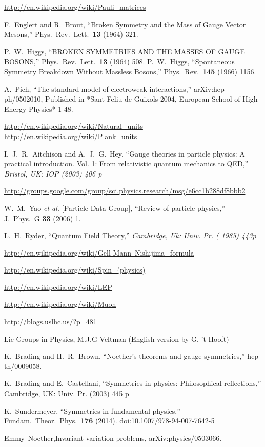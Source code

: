 \begin{thebibliography}{999}
\url{http://en.wikipedia.org/wiki/Pauli_matrices}

  F.~Englert and R.~Brout,
  ``Broken Symmetry and the Mass of Gauge Vector Mesons,''
  Phys.\ Rev.\ Lett.\  {\bf 13} (1964) 321.

  P.~W.~Higgs,
  ``BROKEN SYMMETRIES AND THE MASSES OF GAUGE BOSONS,''
  Phys.\ Rev.\ Lett.\  {\bf 13} (1964) 508.
  P.~W.~Higgs,
  ``Spontaneous Symmetry Breakdown Without Massless Bosons,''
  Phys.\ Rev.\  {\bf 145} (1966) 1156.


  A.~Pich,
  ``The standard model of electroweak interactions,''
  arXiv:hep-ph/0502010,
  Published in *Sant Feliu de Guixols 2004, European School of High-Energy Physics* 1-48.

\url{http://en.wikipedia.org/wiki/Natural_units}
\url{http://en.wikipedia.org/wiki/Plank_units}

  I.~J.~R.~Aitchison and A.~J.~G.~Hey,
  ``Gauge theories in particle physics: A practical introduction. Vol. 1: From
  relativistic quantum mechanics to QED,''
{\it  Bristol, UK: IOP (2003) 406 p}

\url{http://groups.google.com/group/sci.physics.research/msg/e6cc1b288df8bbb2}

 W.~M.~Yao {\it et al.}  [Particle Data Group],
  ``Review of particle physics,''
  J.\ Phys.\ G {\bf 33} (2006) 1.

  L.~H.~Ryder,
  ``Quantum Field Theory,''
{\it  Cambridge, Uk: Univ. Pr. ( 1985) 443p}

\url{http://en.wikipedia.org/wiki/Gell-Mann–Nishijima_formula}

\url{http://en.wikipedia.org/wiki/Spin_(physics)}

\url{http://en.wikipedia.org/wiki/LEP}

\url{http://en.wikipedia.org/wiki/Muon}

\url{http://blogs.uslhc.us/?p=481}

 Lie Groups in Physics, M.J.G Veltman (English version by G. 't Hooft)

  K.~Brading and H.~R.~Brown,
  ``Noether's theorems and gauge symmetries,''
  hep-th/0009058.


  K.~Brading and E.~Castellani,
  ``Symmetries in physics: Philosophical reflections,''
  Cambridge, UK: Univ. Pr. (2003) 445 p

  K.~Sundermeyer,
  ``Symmetries in fundamental physics,''
  Fundam.\ Theor.\ Phys.\  {\bf 176} (2014).
  doi:10.1007/978-94-007-7642-5

 Emmy~Noether,Invariant variation problems, arXiv:physics/0503066.


\end{thebibliography}
